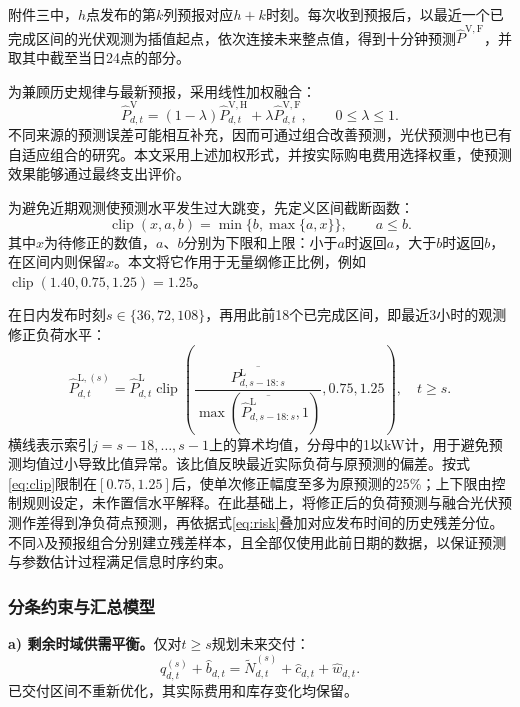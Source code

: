 附件三中，$h$点发布的第$k$列预报对应$h+k$时刻。每次收到预报后，以最近一个已完成区间的光伏观测为插值起点，依次连接未来整点值，得到十分钟预测$\widehat P^{\mathrm{V,F}}$，并取其中截至当日24点的部分。

为兼顾历史规律与最新预报，采用线性加权融合：
\begin{equation}
 \widehat P^{\mathrm V}_{d,t}
 =(1-\lambda)\widehat P^{\mathrm{V,H}}_{d,t}
 +\lambda\widehat P^{\mathrm{V,F}}_{d,t},
 \qquad 0\le\lambda\le1.\label{eq:fusion}
\end{equation}
不同来源的预测误差可能相互补充，因而可通过组合改善预测，光伏预测中也已有自适应组合的研究。本文采用上述加权形式，并按实际购电费用选择权重，使预测效果能够通过最终支出评价。

为避免近期观测使预测水平发生过大跳变，先定义区间截断函数：
\begin{equation}
 \operatorname{clip}(x,a,b)=\min\{b,\max\{a,x\}\},\qquad a\le b.\label{eq:clip}
\end{equation}
其中$x$为待修正的数值，$a$、$b$分别为下限和上限：小于$a$时返回$a$，大于$b$时返回$b$，在区间内则保留$x$。本文将它作用于无量纲修正比例，例如$\operatorname{clip}(1.40,0.75,1.25)=1.25$。

在日内发布时刻$s\in\{36,72,108\}$，再用此前18个已完成区间，即最近3小时的观测修正负荷水平：
\begin{equation}
 \widehat P^{\mathrm L,(s)}_{d,t}
 =\widehat P^{\mathrm L}_{d,t}
 \operatorname{clip}\!\left(
 \frac{\overline{P^{\mathrm L}_{d,s-18:s}}}
      {\max(\overline{\widehat P^{\mathrm L}_{d,s-18:s}},1)},0.75,1.25
 \right),\quad t\ge s.
\end{equation}
横线表示索引$j=s-18,\ldots,s-1$上的算术均值，分母中的1以kW计，用于避免预测均值过小导致比值异常。该比值反映最近实际负荷与原预测的偏差。按式\eqref{eq:clip}限制在$[0.75,1.25]$后，使单次修正幅度至多为原预测的25\%；上下限由控制规则设定，未作置信水平解释。在此基础上，将修正后的负荷预测与融合光伏预测作差得到净负荷点预测，再依据式\eqref{eq:risk}叠加对应发布时间的历史残差分位。不同$\lambda$及预报组合分别建立残差样本，且全部仅使用此前日期的数据，以保证预测与参数估计过程满足信息时序约束。

\subsubsection{分条约束与汇总模型}
\textbf{a) 剩余时域供需平衡。}仅对$t\ge s$规划未来交付：
\begin{equation}
 q^{(s)}_{d,t}+\widehat b_{d,t}
 =\widetilde N^{(s)}_{d,t}+\widehat c_{d,t}+\widehat w_{d,t}.
\end{equation}
已交付区间不重新优化，其实际费用和库存变化均保留。

